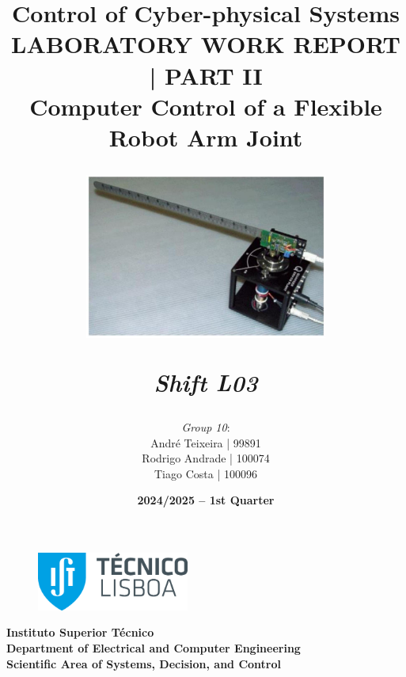 \title{Control of Cyber-physical Systems\\ \vspace{0.5cm} \large LABORATORY WORK REPORT | PART II\\ \vspace{0.5cm} \large Computer Control of a Flexible Robot Arm Joint\begin{center}
\includegraphics[width=0.6\textwidth]{Figs/2024_08_29_9e657742dc855ba919cag-01}

\vspace{15pt}
\emph{Shift L03} %
\end{center}}

\author{ \emph{Group 10}: %
    \\ \tabto{0.1cm}André Teixeira | 99891  %
    \\ \tabto{0.1cm}Rodrigo Andrade | 100074
    \\ \tabto{0.1cm}Tiago Costa | 100096
}
\date{\textbf{2024/2025 – 1st Quarter}}

\begin{figure}[t]
    \flushleft
    \includegraphics[width=5cm]{Figs/IST_A_CMYK_POS.eps} 
\end{figure}

\maketitle
\begin{center}
\textbf{Instituto Superior Técnico\\ Department of Electrical and Computer Engineering\\ Scientific Area of Systems, Decision, and Control}
\end{center}
\vspace{20pt}